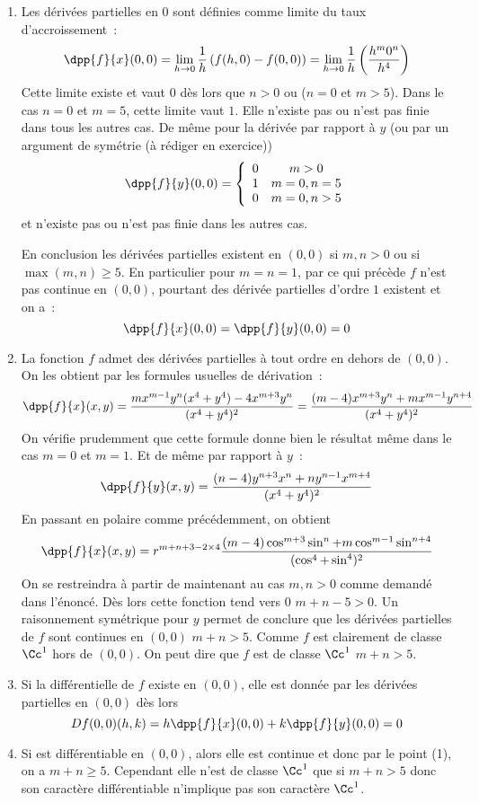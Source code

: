 \documentclass{article}
\begin{document}
\begin{enumerate}
\item Les dérivées partielles en $0$ sont définies comme limite du taux d'accroissement~:
\[
\dpp{f}{x}(0,0)= \lim_{h \to 0} \dfrac{1}{h} \left( f(h,0)  - f(0,0) \right) = \lim_{h \to 0} \dfrac{1}{h} \left(\dfrac{h^m0^n}{h^4} \right)
\]
Cette limite existe et vaut $0$ dès lors que $n>0$ ou ($n=0$ et $m>5$). Dans le cas $n=0$ et $m=5$, cette limite vaut $1$. Elle n'existe pas ou n'est pas finie dans tous les autres cas.
De même pour la dérivée par rapport à $y$ (ou par un argument de symétrie (à rédiger en exercice))
\[
\dpp{f}{y}(0,0) = \left\lbrace
\begin{array}{cc}
0 & m>0 \\ 
1 & m=0, n=5 \\ 
0 & m=0, n> 5
\end{array} 
\right.
\]
et n'existe pas ou n'est pas finie dans les autres cas.

En conclusion les dérivées partielles existent en $(0,0)$ si $m,n>0$ ou si $\max (m,n)\geq 5$. En particulier pour $m=n=1$, par ce qui précède $f$ n'est pas continue en $(0,0)$, pourtant des dérivée partielles d'ordre $1$ existent et on a~:
\[
\dpp{f}{x}(0,0) = \dpp{f}{y}(0,0) = 0
\]

\item La fonction $f$ admet des dérivées partielles à tout ordre en dehors de $(0,0)$. On les obtient par les formules usuelles de dérivation~:
\[
\dpp{f}{x}(x,y) = \dfrac{mx^{m-1}y^n(x^4+y^4) - 4x^{m+3}y^n}{(x^4+y^4)^2} = 
\dfrac{(m-4)x^{m+3}y^n +mx^{m-1}y^{n+4}}{(x^4+y^4)^2}
\]
On vérifie prudemment que cette formule donne bien le résultat même dans le cas $m=0$ et $m=1$. Et de même par rapport à $y$~:
\[
\dpp{f}{y}(x,y) = \dfrac{(n-4)y^{n+3}x^n +ny^{n-1}x^{m+4}}{(x^4+y^4)^2}
\]
En passant en polaire comme précédemment, on obtient
\[
\dpp{f}{x}(x,y) = r^{m+n+3-2\times 4} \dfrac{(m-4)\cos^{m+3}\sin^n +m\cos^{m-1}\sin^{n+4}}{(\cos^4+\sin^4)^2}
\]
On se restreindra à partir de maintenant au cas $m,n>0$ comme demandé dans l'énoncé. Dès lors cette fonction tend vers $0$ \ssi $m+n-5 >0$. Un raisonnement symétrique pour $y$ permet de conclure que les dérivées partielles de $f$ sont continues en $(0,0)$ \ssi $m+n >5$. Comme $f$ est clairement de classe $\Cc^1$ hors de $(0,0)$. On peut dire que $f$ est de classe $\Cc^1$ \ssi $m+n >5$.
\item Si la différentielle de $f$ existe en $(0,0)$, elle est donnée par les dérivées partielles en $(0,0)$ dès lors
\[
Df(0,0)(h,k) = h \dpp{f}{x}(0,0) + k \dpp{f}{y}(0,0) = 0
\]
\item Si est différentiable en $(0,0)$, alors elle est continue et donc par le point (1), on a $m+n \geq 5$. Cependant elle n'est de classe $\Cc^1$ que si $m+n > 5$ donc son caractère différentiable n'implique pas son caractère $\Cc^1$.
\end{enumerate}
\end{document}

